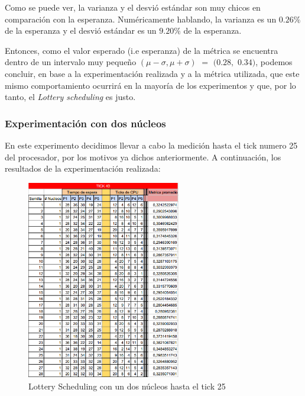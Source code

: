 Como se puede ver, la varianza y el desvió estándar son muy chicos en comparación con la esperanza.
Numéricamente hablando, la varianza es un $0.26\%$ de la esperanza y el desvió estándar es un $9.20\%$ de la esperanza.

Entonces, como el valor esperado (i.e esperanza) de la métrica se encuentra dentro de un intervalo muy pequeño $(\mu - \sigma, \mu + \sigma)$ $=$ $(0.28,$ $0.34)$, podemos concluir, en base a la experimentación realizada y a la métrica utilizada, que este mismo comportamiento ocurrirá en la mayoría de los experimentos y que, por lo tanto, el \textit{Lottery scheduling} es justo.



\subsubsection{Experimentación con dos núcleos}

En este experimento decidimos llevar a cabo la medición hasta el tick numero 25 del procesador, por los motivos ya dichos anteriormente.
A continuación, los resultados de la experimentación realizada:


\begin{figure}[H]
\begin{center}
\includegraphics[width=0.6\textwidth]{img/fotaza1.png}
     \caption{Lottery Scheduling con un dos núcleos hasta el tick 25}
\end{center}
\end{figure}

